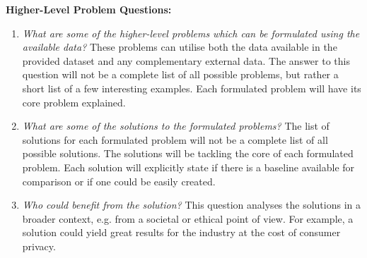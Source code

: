 \begin{description}
  \item \textbf{Higher-Level Problem Questions:}
  \begin{enumerate}
    \item \textit{What are some of the higher-level problems which can be formulated using the available data?} \newline
    These problems can utilise both the data available in the provided dataset and any complementary external data.
    The answer to this question will not be a complete list of all possible problems, but rather a short list of a few interesting examples.
    Each formulated problem will have its core problem explained.
    \item \textit{What are some of the solutions to the formulated problems?} \newline
    The list of solutions for each formulated problem will not be a complete list of all possible solutions.
    The solutions will be tackling the core of each formulated problem.
    Each solution will explicitly state if there is a baseline available for comparison or if one could be easily created.
    \item \textit{Who could benefit from the solution?} \newline
    This question analyses the solutions in a broader context, e.g. from a societal or ethical point of view.
    For example, a solution could yield great results for the industry at the cost of consumer privacy.
  \end{enumerate}


\end{description}
